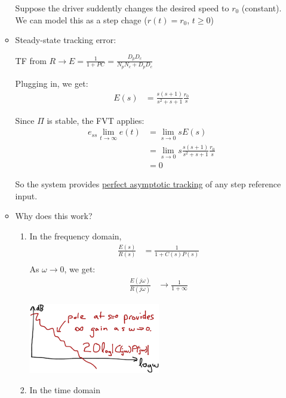 \begin{enumerate}
\begin{itemize}
                    Suppose the driver suddently changes the desired speed to $r_0$ (constant).
                    We can model this as a step chage ($r(t) = r_0$, $t \ge 0$)

                \item Steady-state tracking error:

                    TF from $R \to E = \frac{1}{1+PC} = \frac{D_p D_c}{N_p N_c + D_p D_c}$

                    Plugging in, we get:
                    \begin{align*}
                        E(s) &= \frac{s(s+1)}{s^2 + s + 1} \frac{r_0}{s}
                    \end{align*}

                    Since $\Pi$ is stable, the FVT applies:
                    \begin{align*}
                        e_{ss} \lim_{t \to \infty} e(t) &= \lim_{s \to 0} s E(s) \\
                        &= \lim_{s \to 0} s\frac{s(s+1)}{s^2 + s + 1} \frac{r_0}{s} \\
                        &= 0
                    \end{align*}

                    So the system provides \uline{perfect asymptotic tracking} of any step reference input.
                \item Why does this work?
                    \begin{enumerate}
                        \item In the frequency domain,
                            \begin{align*}
                                \frac{E(s)}{R(s)} &= \frac{1}{1+C(s)P(s)} \\
                            \end{align*}
                            As $\omega \to 0$, we get:
                            \begin{align*}
                                \frac{E(j \omega)}{R(j \omega)} &\to  \frac{1}{1+\infty}
                            \end{align*}
                            \begin{center}\includegraphics[width=0.5\textwidth,keepaspectratio]{images/5-11-a.png}\end{center}
                        \item In the time domain


\end{enumerate}
\end{itemize}
\end{enumerate}
